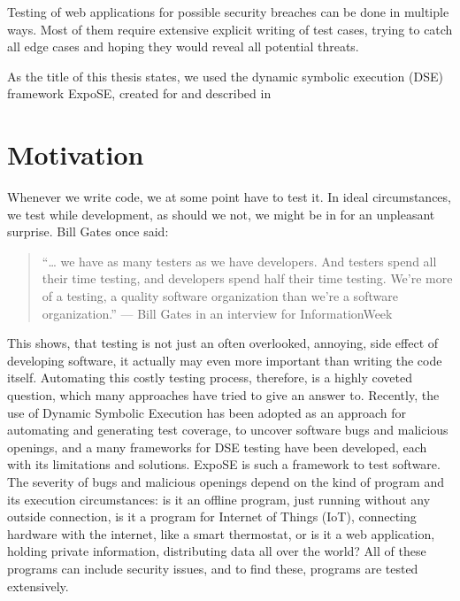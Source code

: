 Testing of web applications for possible security breaches can be done in multiple ways. Most of them require extensive explicit writing of test cases, trying to catch all edge cases and hoping they would reveal all potential threats. 

As the title of this thesis states, we used the dynamic symbolic execution (DSE) framework ExpoSE, created for and described in \citet{loring_expose_2017}


\section{Motivation}
\label{sec:motivation}

Whenever we write code, we at some point have to test it. In ideal circumstances, we test while development, as should we not, we might be in for an unpleasant surprise. Bill Gates once said:
\begin{quote}

    “… we have as many testers as we have developers. And testers spend all their time testing, and developers spend half their time testing. We're more of a testing, a quality software organization than we're a software organization.” — Bill Gates in an interview for InformationWeek \cite{bill_q_2002} 
\end{quote}
This shows, that testing is not just an often overlooked, annoying, side effect of developing software, it actually may even more important than writing the code itself.
Automating this costly testing process, therefore, is a highly coveted question, which many approaches have tried to give an answer to. 
Recently, the use of Dynamic Symbolic Execution has been adopted as an approach for automating and generating test coverage, to uncover software bugs and malicious openings, and a many frameworks for DSE testing have been developed, each with its limitations and solutions.
ExpoSE is such a framework to test software.\\

The severity of bugs and malicious openings depend on the kind of program and its execution circumstances: is it an offline program, just running without any outside connection, is it a program for Internet of Things (IoT), connecting hardware with the internet, like a smart thermostat, or is it a web application, holding private information, distributing data all over the world?
All of these programs can include security issues, and to find these, programs are tested extensively. 

